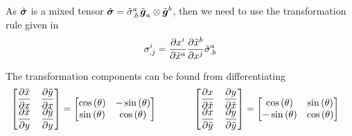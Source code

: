 As $\tilde{ \boldsymbol{\mathit{ \sigma }} }$ is a mixed tensor \ie
$\tilde{ \boldsymbol{\mathit{ \sigma }} }=\tilde{ \sigma }^{a}_{.b}\, \tilde{  \boldsymbol{ g }  }_{a} \otimes \tilde{  \boldsymbol{ g }  }^{b} $,
then we need to use the transformation rule given in
\ie
\begin{equation}
  \conductivitytensorsymbol^{i}_{.j}=\delby{x^{i}}{\tilde{x}^{a}}\delby{\tilde{x}^{b}}{x^{j}}\tilde{\conductivitytensorsymbol}^{a}_{.b}
  \label{eqn:AnsioPlateConductivityTensorTransformation}
\end{equation}

The transformation components can be found from differentiating
\ie
\begin{equation}
  \begin{aligned}
    \begin{bmatrix}
       \dfrac{\partial \tilde{x}}{\partial x}  &  \dfrac{\partial \tilde{y}}{\partial x}  \\
       \dfrac{\partial \tilde{x}}{\partial y}  &  \dfrac{\partial \tilde{y}}{\partial y} 
    \end{bmatrix} &=
    \begin{bmatrix}
        \cos\left( \theta \right)   & -  \sin\left( \theta \right)   \\
        \sin\left( \theta \right)   &   \cos\left( \theta \right)  
    \end{bmatrix} &\qquad&&
    \begin{bmatrix}
       \dfrac{\partial x}{\partial \tilde{x}}  &  \dfrac{\partial y}{\partial \tilde{x}}  \\
       \dfrac{\partial x}{\partial \tilde{y}}  &  \dfrac{\partial y}{\partial \tilde{y}} 
    \end{bmatrix}&=
    \begin{bmatrix}
        \cos\left( \theta \right)   &   \sin\left( \theta \right)   \\
      -  \sin\left( \theta \right)   &   \cos\left( \theta \right)  
    \end{bmatrix}
  \end{aligned}
\end{equation}

